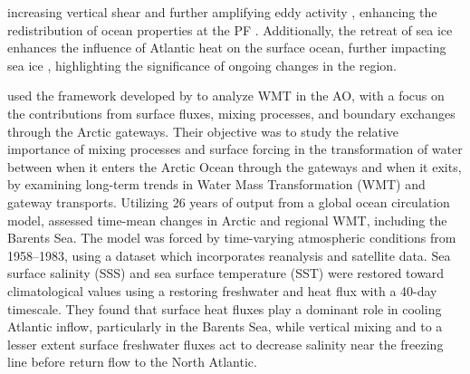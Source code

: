 \documentclass[draft]{agujournal2019}
\begin{document}
increasing vertical shear and further amplifying eddy activity \cite{Shao2023,li2024eddy}, enhancing the redistribution of ocean properties at the PF \cite{Porter2020}. Additionally, the retreat of sea ice enhances the influence of Atlantic heat on the surface ocean, further impacting sea ice \cite{Dorr2024}, highlighting the significance of ongoing changes in the region.

 used the framework developed by  to analyze WMT in the AO, with a focus on the contributions from surface fluxes, mixing processes, and boundary exchanges through the Arctic gateways. Their objective was to study the relative importance of mixing processes and surface forcing in the transformation of water between when it enters the Arctic Ocean through the gateways and when it exits, by examining long-term trends in Water Mass Transformation (WMT) and gateway transports. Utilizing 26 years of output from a global ocean circulation model,  assessed time-mean changes in Arctic and regional WMT, including the Barents Sea. The model was forced by time-varying atmospheric conditions from 1958--1983, using a dataset which incorporates reanalysis and satellite data. Sea surface salinity (SSS) and sea surface temperature (SST) were restored toward climatological values using a restoring freshwater and heat flux with a 40-day timescale. They found that surface heat fluxes play a dominant role in cooling Atlantic inflow, particularly in the Barents Sea, while vertical mixing and to a lesser extent surface freshwater fluxes act to decrease salinity near the freezing line before return flow to the North Atlantic. 
\end{document}
